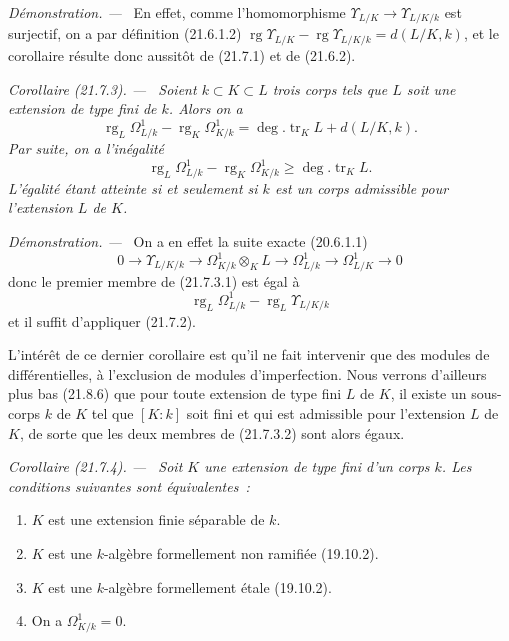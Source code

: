 \documentclass[10pt,oneside]{book}
\makeatletter
\newcommand{\setmanualcurrentlabel}[1]{\def\@currentlabel{#1}}
\newcommand{\oldpage}[2][]{%
  \setcounter{footnote}{0}%
  \marginpar{\scriptsize\textbf{#1}~|~#2}\ignorespaces}
\newenvironment{corollary}[1][]{%
  \setmanualcurrentlabel{#1}\par\medskip\noindent\itshape Corollaire (#1). ---\ }{\par}
\newenvironment{proof}{%
  \par\medskip\noindent\textit{Démonstration. ---\ }}{\par}
\makeatother
\begin{document}
\begin{proof}
En effet, comme l'homomorphisme
$\Upsilon_{L/K}\to\Upsilon_{L/K/k}$ est surjectif, on a par définition
(21.6.1.2)
$\operatorname{rg}\Upsilon_{L/K}-\operatorname{rg}\Upsilon_{L/K/k}
=d(L/K,k)$, et le corollaire résulte donc aussitôt de (21.7.1) et de
(21.6.2).
\end{proof}

\begin{corollary}[21.7.3]
\label{0.21.7.3-fr}
Soient $k\subset K\subset L$ trois corps tels que $L$ soit une extension de
type fini de $k$. Alors on a
\begin{equation}
\tag{21.7.3.1}
\label{0.21.7.3.1-fr}
\operatorname{rg}_L\Omega^1_{L/k}-\operatorname{rg}_K\Omega^1_{K/k}
=\deg.\operatorname{tr}_K L+d(L/K,k).
\end{equation}
\oldpage[0\textsubscript{IV-1}]{171}
Par suite, on a l'inégalité
\begin{equation}
\tag{21.7.3.2}
\label{0.21.7.3.2-fr}
\operatorname{rg}_L\Omega^1_{L/k}-\operatorname{rg}_K\Omega^1_{K/k}
\geqslant\deg.\operatorname{tr}_K L.
\end{equation}
L'égalité étant atteinte si et seulement si $k$ est un corps admissible pour
l'extension $L$ de $K$.
\end{corollary}

\begin{proof}
On a en effet la suite exacte (20.6.1.1)
\[
0\to\Upsilon_{L/K/k}\to\Omega^1_{K/k}\otimes_KL\to\Omega^1_{L/k}
\to\Omega^1_{L/K}\to0
\]
donc le premier membre de (21.7.3.1) est égal à
\[
\operatorname{rg}_L\Omega^1_{L/k}-\operatorname{rg}_L\Upsilon_{L/K/k}
\]
et il suffit d'appliquer (21.7.2).
\end{proof}

L'intérêt de ce dernier corollaire est qu'il ne fait intervenir que des
modules de différentielles, à l'exclusion de modules d'imperfection. Nous
verrons d'ailleurs plus bas (21.8.6) que pour toute extension de type fini
$L$ de $K$, il existe un sous-corps $k$ de $K$ tel que $[K:k]$ soit fini et
qui est admissible pour l'extension $L$ de $K$, de sorte que les deux membres
de (21.7.3.2) sont alors égaux.

\begin{corollary}[21.7.4]
\label{0.21.7.4-fr}
Soit $K$ une extension de type fini d'un corps $k$. Les conditions suivantes
sont équivalentes~:
\begin{enumerate}
  \item[\rm a)] $K$ est une extension finie séparable de $k$.
  \item[\rm b)] $K$ est une $k$-algèbre formellement non ramifiée (19.10.2).
  \item[\rm c)] $K$ est une $k$-algèbre formellement étale (19.10.2).
  \item[\rm d)] On a $\Omega^1_{K/k}=0$.
\end{enumerate}
\end{corollary}
\end{document}
